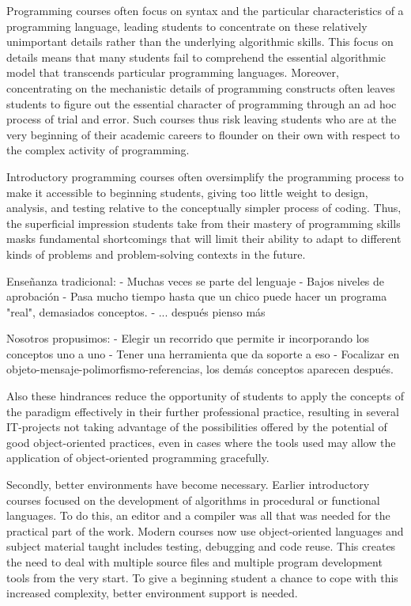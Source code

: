 \documentclass[preprint,10pt]{sigplanconf}
\begin{document}
Programming courses often focus on syntax and the particular characteristics of a
programming language, leading students to concentrate on these relatively unimportant
details rather than the underlying algorithmic skills. This focus on details means that
many students fail to comprehend the essential algorithmic model that transcends
particular programming languages. Moreover, concentrating on the mechanistic
details of programming constructs often leaves students to figure out the essential
character of programming through an ad hoc process of trial and error. Such courses
thus risk leaving students who are at the very beginning of their academic careers to
flounder on their own with respect to the complex activity of programming.

Introductory programming courses often oversimplify the programming process to
make it accessible to beginning students, giving too little weight to design, analysis,
and testing relative to the conceptually simpler process of coding. Thus, the
superficial impression students take from their mastery of programming skills masks
fundamental shortcomings that will limit their ability to adapt to different kinds of
problems and problem-solving contexts in the future.
\cite{the_joint_task_force_on_computing_curricula_computing_2001}

Enseñanza tradicional:
- Muchas veces se parte del lenguaje
- Bajos niveles de aprobación
- Pasa mucho tiempo hasta que un chico puede hacer un programa "real", demasiados conceptos.
- ... después pienso más

Nosotros propusimos:
- Elegir un recorrido que permite ir incorporando los conceptos uno a uno
- Tener una herramienta que da soporte a eso
- Focalizar en objeto-mensaje-polimorfismo-referencias, los demás conceptos aparecen después.


Also these hindrances reduce the opportunity of students to apply
the concepts of the paradigm effectively in their further
professional practice, resulting in several IT-projects not taking
advantage of the possibilities offered by the potential of good
object-oriented practices, even in cases where the tools used may
allow the application of object-oriented programming gracefully. \cite{lombardi_instances_2007}

Secondly, better environments have become necessary. Earlier introductory courses
focused on the development of algorithms in procedural or functional languages. To
do this, an editor and a compiler was all that was needed for the practical part of the
work. Modern courses now use object-oriented languages and subject material
taught includes testing, debugging and code reuse. This creates the need to deal with
multiple source files and multiple program development tools from the very start. To
give a beginning student a chance to cope with this increased complexity, better
environment support is needed. \cite{kolling_problem_1999}
\end{document}
